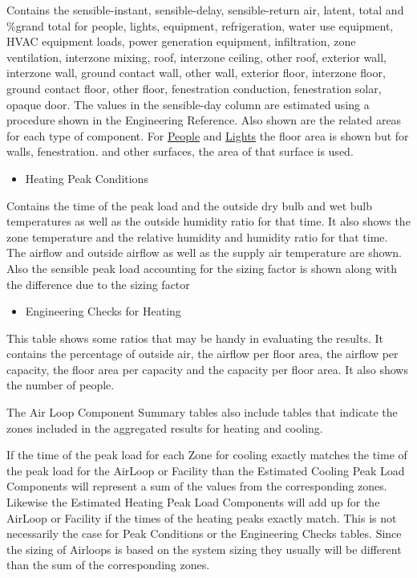 Contains the sensible-instant, sensible-delay, sensible-return air, latent, total and \%grand total for people, lights, equipment, refrigeration, water use equipment, HVAC equipment loads, power generation equipment, infiltration, zone ventilation, interzone mixing, roof, interzone ceiling, other roof, exterior wall, interzone wall, ground contact wall, other wall, exterior floor, interzone floor, ground contact floor, other floor, fenestration conduction, fenestration solar, opaque door. The values in the sensible-day column are estimated using a procedure shown in the Engineering Reference. Also shown are the related areas for each type of component. For \hyperref[people]{People} and \hyperref[lights-000]{Lights} the floor area is shown but for walls, fenestration. and other surfaces, the area of that surface is used.

\begin{itemize}
\tightlist
\item
  Heating Peak Conditions
\end{itemize}

Contains the time of the peak load and the outside dry bulb and wet bulb temperatures as well as the outside humidity ratio for that time. It also shows the zone temperature and the relative humidity and humidity ratio for that time. The airflow and outside airflow as well as the supply air temperature are shown. Also the sensible peak load accounting for the sizing factor is shown along with the difference due to the sizing factor

\begin{itemize}
\tightlist
\item
  Engineering Checks for Heating
\end{itemize}

This table shows some ratios that may be handy in evaluating the results. It contains the percentage of outside air, the airflow per floor area, the airflow per capacity, the floor area per capacity and the capacity per floor area. It also shows the number of people.

The Air Loop Component Summary tables also include tables that indicate the zones included in the aggregated results for heating and cooling.

If the time of the peak load for each Zone for cooling exactly matches the time of the peak load for the AirLoop or Facility than the Estimated Cooling Peak Load Components will represent a sum of the values from the corresponding zones. Likewise the Estimated Heating Peak Load Components will add up for the AirLoop or Facility if the times of the heating peaks exactly match. This is not necessarily the case for Peak Conditions or the Engineering Checks tables. Since the sizing of Airloops is based on the system sizing they usually will be different than the sum of the corresponding zones.

